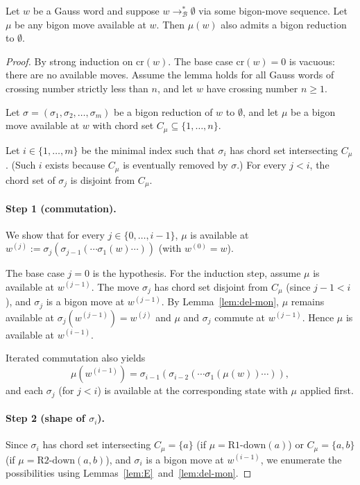 
\begin{lemma}\label{lem:rescue}
Let $w$ be a Gauss word and suppose $w \to^{*}_{\mathcal{B}} \emptyset$
via some bigon-move sequence. Let $\mu$ be any bigon move available
at $w$. Then $\mu(w)$ also admits a bigon reduction to $\emptyset$.
\end{lemma}

\begin{proof}
By strong induction on $\mathrm{cr}(w)$. The base case $\mathrm{cr}(w)
= 0$ is vacuous: there are no available moves. Assume the lemma
holds for all Gauss words of crossing number strictly less than $n$,
and let $w$ have crossing number $n \geq 1$.

Let $\sigma = (\sigma_1, \sigma_2, \dots, \sigma_m)$ be a bigon
reduction of $w$ to $\emptyset$, and let $\mu$ be a bigon move
available at $w$ with chord set $C_\mu \subseteq \{1, \dots, n\}$.

Let $i \in \{1, \dots, m\}$ be the minimal index such that $\sigma_i$
has chord set intersecting $C_\mu$. (Such $i$ exists because $C_\mu$
is eventually removed by $\sigma$.) For every $j < i$, the chord set
of $\sigma_j$ is disjoint from $C_\mu$.

\paragraph{Step 1 (commutation).}
We show that for every $j \in \{0, \dots, i-1\}$, $\mu$ is available
at $w^{(j)} := \sigma_j(\sigma_{j-1}(\cdots \sigma_1(w) \cdots))$
(with $w^{(0)} = w$).

The base case $j = 0$ is the hypothesis. For the induction step,
assume $\mu$ is available at $w^{(j-1)}$. The move $\sigma_j$ has
chord set disjoint from $C_\mu$ (since $j-1 < i$), and $\sigma_j$ is
a bigon move at $w^{(j-1)}$. By Lemma~\ref{lem:del-mon}, $\mu$
remains available at $\sigma_j(w^{(j-1)}) = w^{(j)}$ and $\mu$ and
$\sigma_j$ commute at $w^{(j-1)}$. Hence $\mu$ is available at
$w^{(i-1)}$.

Iterated commutation also yields
\begin{equation}\label{eq:commute}
\mu(w^{(i-1)}) = \sigma_{i-1}(\sigma_{i-2}(\cdots \sigma_1(\mu(w))
\cdots)),
\end{equation}
and each $\sigma_j$ (for $j < i$) is available at the corresponding
state with $\mu$ applied first.

\paragraph{Step 2 (shape of $\sigma_i$).}
Since $\sigma_i$ has chord set intersecting $C_\mu = \{a\}$ (if
$\mu = \text{R1-down}(a)$) or $C_\mu = \{a, b\}$ (if $\mu =
\text{R2-down}(a, b)$), and $\sigma_i$ is a bigon move at
$w^{(i-1)}$, we enumerate the possibilities using
Lemmas~\ref{lem:E}~and~\ref{lem:del-mon}.


\end{proof}
